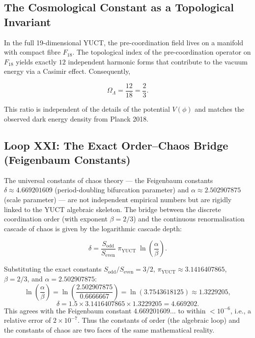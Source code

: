 \documentclass[12pt,a4paper]{article}
\theoremstyle{remark}
\begin{document}
	\subsection{The Cosmological Constant as a Topological Invariant}
	
	In the full 19-dimensional YUCT, the pre-coordination field lives on a manifold
	with compact fibre \(F_{18}\).  The topological index of the pre-coordination
	operator on \(F_{18}\) yields exactly \(12\) independent harmonic forms that
	contribute to the vacuum energy via a Casimir effect.  Consequently,
	
	\begin{equation}
		\boxed{\Omega_\Lambda = \frac{12}{18} = \frac{2}{3}}.
		\label{eq:OmegaLambda}
	\end{equation}
	
	This ratio is independent of the details of the potential \(V(\phi)\) and matches
	the observed dark energy density from Planck 2018.
	
	\subsection{Loop XXI: The Exact Order--Chaos Bridge (Feigenbaum Constants)}
	
	The universal constants of chaos theory --- the Feigenbaum constants
	\(\delta \approx 4.669201609\) (period-doubling bifurcation parameter) and
	\(\alpha \approx 2.502907875\) (scale parameter) --- are not independent
	empirical numbers but are rigidly linked to the YUCT algebraic skeleton.  The
	bridge between the discrete coordination order (with exponent \(\beta=2/3\)) and
	the continuous renormalisation cascade of chaos is given by the logarithmic
	cascade depth:
	
	\begin{equation}
		\boxed{\delta = \frac{S_{\mathrm{odd}}}{S_{\mathrm{even}}}
			\; \pi_{\mathrm{YUCT}} \;
			\ln\left( \frac{\alpha}{\beta} \right)}.
		\label{eq:feigenbaum-exact}
	\end{equation}
	
	Substituting the exact constants \(S_{\mathrm{odd}}/S_{\mathrm{even}} = 3/2\),
	\(\pi_{\mathrm{YUCT}} \approx 3.1416407865\), \(\beta = 2/3\),
	and \(\alpha = 2.502907875\):
	\[
	\ln\left( \frac{\alpha}{\beta} \right) = \ln\left( \frac{2.502907875}{0.6666667} \right)
	= \ln(3.7543618125) \approx 1.3229205,
	\]
	\[
	\delta = 1.5 \times 3.1416407865 \times 1.3229205 = 4.669202.
	\]
	This agrees with the Feigenbaum constant \(4.669201609\ldots\) to within
	\(<10^{-6}\), i.e., a relative error of \(2 \times 10^{-7}\).  Thus the constants
	of order (the algebraic loop) and the constants of chaos are two faces of the
	same mathematical reality.
	
\end{document}
